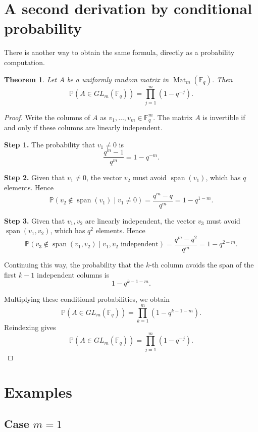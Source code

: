 \documentclass[11pt]{article}
\newcommand{\F}{\mathbb{F}}
\newcommand{\Mat}{\operatorname{Mat}}
\newcommand{\Span}{\operatorname{span}}
\newcommand{\Prob}{\mathbb{P}}
\theoremstyle{definition}
\theoremstyle{plain}
\newtheorem{theorem}[definition]{Theorem}
\begin{document}
	\section{A second derivation by conditional probability}
	
	There is another way to obtain the same formula, directly as a probability computation.
	
	\begin{theorem}
		Let \(A\) be a uniformly random matrix in \(\Mat_m(\F_q)\). Then
		\[
		\Prob(A\in GL_m(\F_q))=\prod_{j=1}^{m}(1-q^{-j}).
		\]
	\end{theorem}
	
	\begin{proof}
		Write the columns of \(A\) as \(v_1,\dots,v_m\in \F_q^m\). The matrix \(A\) is invertible if and only if these columns are linearly independent.
		
		\medskip
		
		\noindent\textbf{Step 1.}
		The probability that \(v_1\neq 0\) is
		\[
		\frac{q^m-1}{q^m}=1-q^{-m}.
		\]
		
		\medskip
		
		\noindent\textbf{Step 2.}
		Given that \(v_1\neq 0\), the vector \(v_2\) must avoid \(\Span(v_1)\), which has \(q\) elements. Hence
		\[
		\Prob(v_2\notin \Span(v_1)\mid v_1\neq 0)
		=
		\frac{q^m-q}{q^m}
		=
		1-q^{1-m}.
		\]
		
		\medskip
		
		\noindent\textbf{Step 3.}
		Given that \(v_1,v_2\) are linearly independent, the vector \(v_3\) must avoid \(\Span(v_1,v_2)\), which has \(q^2\) elements. Hence
		\[
		\Prob(v_3\notin \Span(v_1,v_2)\mid v_1,v_2\text{ independent})
		=
		\frac{q^m-q^2}{q^m}
		=
		1-q^{2-m}.
		\]
		
		Continuing this way, the probability that the \(k\)-th column avoids the span of the first \(k-1\) independent columns is
		\[
		1-q^{k-1-m}.
		\]
		
		Multiplying these conditional probabilities, we obtain
		\[
		\Prob(A\in GL_m(\F_q))
		=
		\prod_{k=1}^{m}(1-q^{k-1-m}).
		\]
		Reindexing gives
		\[
		\Prob(A\in GL_m(\F_q))
		=
		\prod_{j=1}^{m}(1-q^{-j}).
		\]
	\end{proof}
	
	\section{Examples}
	
	\subsection{Case \(m=1\)}
	
\end{document}
